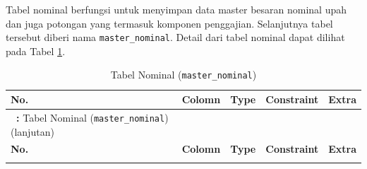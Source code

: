 \begin{enumerate}
		        Tabel nominal berfungsi untuk menyimpan data master besaran nominal upah dan juga potongan yang termasuk komponen penggajian. Selanjutnya tabel tersebut diberi nama \texttt{master\_nominal}. Detail dari tabel nominal dapat dilihat pada Tabel \ref{tabel_nominal}.
		        \begin{spacing}{1.0}
		        \begin{longtable}{|>{\centering}p{1.5em}|p{3cm}|p{3cm}|p{3cm}|p{2cm}|}
			        \caption{Tabel Nominal (\texttt{master\_nominal})} \label{tabel_nominal} \\
                    \hline \textbf{No.} & \textbf{Colomn} & \textbf{Type} & \textbf{Constraint} & \textbf{Extra}  \\ \hline 
                    \endfirsthead
                    \multicolumn{5}{c}%
                    {{\bfseries \tablename\ \thetable{}: }Tabel Nominal (\texttt{master\_nominal}) (lanjutan)} \\
                    \hline \textbf{No.} & \textbf{Colomn} & \textbf{Type} & \textbf{Constraint} & \textbf{Extra}  \\ \hline
                    \endhead
                    \hline
                    \endfoot
                    \hline \hline
                    \endlastfoot
                    

\end{longtable}
\end{spacing}
\end{enumerate}
